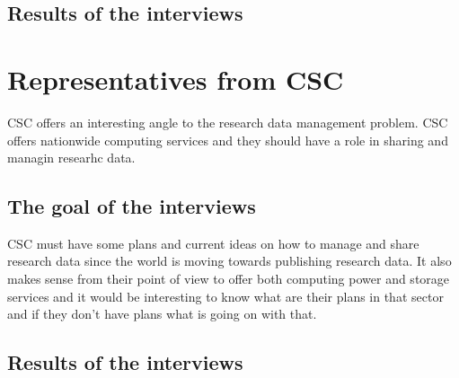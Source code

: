 \subsection{Results of the interviews}

\section{Representatives from CSC}

CSC offers an interesting angle to the research data management problem. CSC
offers nationwide computing services and they should have a role in sharing and
managin researhc data.

\subsection{The goal of the interviews}

CSC must have some plans and current ideas on how to manage and share research
data since the world is moving towards publishing research data. It also makes
sense from their point of view to offer both computing power and storage
services and it would be interesting to know what are their plans in that
sector and if they don't have plans what is going on with that.

\subsection{Results of the interviews}

\section{}

